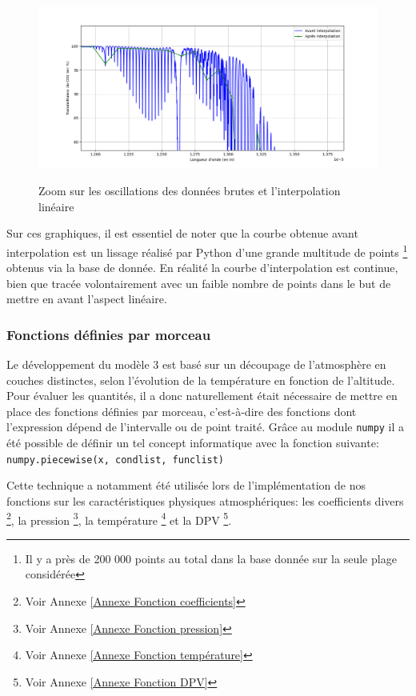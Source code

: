 \documentclass[a4paper, 12pt]{report} %
\newcommand{\figcaptionwithsource}[3]{\caption[#1 
            \newline #2]{#1} \addtocontents{lof}{\protect\vspace{1\baselineskip}}}
\newcommand{\annexeref}[1]{Voir Annexe \ref{#1}}
\begin{document}
\begin{figure}[H]
    \begin{center}
    \includegraphics[scale=0.55]{Images/Taux transmission CO2 2.png}
    \figcaptionwithsource{Zoom sur les oscillations des données brutes et l'interpolation linéaire}{\textit{Python 3.12}}{fig:figure1}
    \label{fig:figure1}
    \end{center} 
\end{figure}

    Sur ces graphiques, il est essentiel de noter que la courbe
obtenue avant interpolation est un lissage réalisé par Python d'une grande multitude de points \footnote{Il y a près de 200 000 points au total dans la base donnée sur la seule plage considérée} obtenus via la base de donnée. En réalité la courbe d'interpolation est continue, bien que tracée volontairement avec un faible nombre de points dans le but de mettre en avant l'aspect linéaire.

\subsubsection{Fonctions définies par morceau}

    Le développement du modèle 3 est basé sur un découpage de
l'atmosphère en couches distinctes, selon l'évolution de la température en fonction de l'altitude. Pour évaluer les quantités, il a donc naturellement était nécessaire de mettre en place des fonctions définies par morceau, c'est-à-dire des fonctions dont l'expression dépend de l'intervalle ou de point traité. Grâce au module \texttt{numpy}  il a été possible de définir un tel concept informatique avec la fonction suivante: \texttt{numpy.piecewise(x, condlist, funclist)} \vspace{\baselineskip}

    Cette technique a notamment été utilisée lors de l'implémentation
de nos fonctions sur les caractéristiques physiques atmosphériques: les coefficients divers \footnote{\annexeref{Annexe Fonction  coefficients}}, la pression \footnote{\annexeref{Annexe Fonction pression}}, la température \footnote{\annexeref{Annexe Fonction température}} et la DPV \footnote{\annexeref{Annexe Fonction DPV}}.
    
\end{document}
